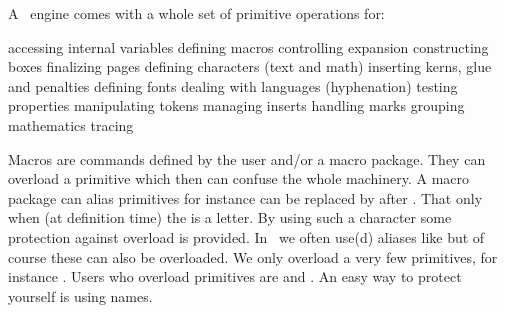 




\definecolor[maincolor][r=.3,b=.3]

\startdocument
  [title={OVERLOAD PROTECTION},
   banner={the downside of macros},
   location={context\enspace {\bf 2021}\enspace meeting}]


\starttitle[title=Primitives]

A \TEX\ engine comes with a whole set of primitive operations for:

\startitemize[packed]
    \startitem
        accessing internal variables
    \stopitem
    \startitem
        defining macros
    \stopitem
    \startitem
        controlling expansion
    \stopitem
    \startitem
        constructing boxes
    \stopitem
    \startitem
        finalizing pages
    \stopitem
    \startitem
        defining characters (text and math)
    \stopitem
    \startitem
        inserting kerns, glue and penalties
    \stopitem
    \startitem
        defining fonts
    \stopitem
    \startitem
        dealing with languages (hyphenation)
    \stopitem
    \startitem
        testing properties
    \stopitem
    \startitem
        manipulating tokens
    \stopitem
    \startitem
        managing inserts
    \stopitem
    \startitem
        handling marks
    \stopitem
    \startitem
        grouping
    \stopitem
    \startitem
        mathematics
    \stopitem
    \startitem
        tracing
    \stopitem
\stopitemize

\stoptitle

\starttitle[title=Macros]

\startitemize
    \startitem
        Macros are commands defined by the user and/or a macro package.
    \stopitem
    \startitem
        They can overload a primitive which then can confuse the whole machinery.
    \stopitem
    \startitem
        A macro package can alias primitives for instance \type {\relax} can be
        replaced by  after .
    \stopitem
    \startitem
        That only when (at definition time) the \type {_} is a letter. By using such
        a character some protection against overload is provided.
    \stopitem
    \startitem
        In \CONTEXT\ we often use(d) aliases like \type {\normalrelax} but of course
        these can also be overloaded.
    \stopitem
    \startitem
        We only overload a very few primitives, for instance \type {\language}.
    \stopitem
    \startitem
        Users who overload primitives are  and .
    \stopitem
    \startitem
        An easy way to protect yourself is using \type {\CamelCase} names.
    \stopitem
\stopitemize

